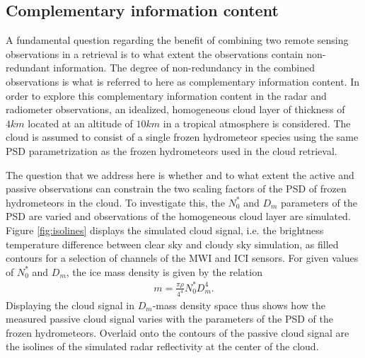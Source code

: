 \documentclass[journal abbreviation, manuscript]{copernicus}
\begin{document}
\subsection{Complementary information content}
\label{sec:orgdc1b0b8}

A fundamental question regarding the benefit of combining two remote sensing
observations in a retrieval is to what extent the observations contain
non-redundant information. The degree of non-redundancy in the combined
observations is what is referred to here as complementary information content.
In order to explore this complementary information content in the radar and
radiometer observations, an idealized, homogeneous cloud layer of thickness of
$4\unit{km}$ located at an altitude of $10\unit{km}$ in a tropical atmosphere is
considered. The cloud is assumed to consist of a single frozen hydrometeor
species using the same PSD parametrization as the frozen hydrometeors used in
the cloud retrieval.

The question that we address here is whether and to what extent the active and
passive observations can constrain the two scaling factors of the PSD of frozen
hydrometeors in the cloud. To investigate this, the $N_0^*$ and $D_m$ parameters
of the PSD are varied and observations of the homogeneous cloud layer are
simulated. Figure \ref{fig:isolines} displays the simulated cloud signal, i.e.
the brightness temperature difference between clear sky and cloudy sky
simulation, as filled contours for a selection of channels of the MWI and ICI
sensors. For given values of $N_0^*$ and $D_m$, the ice mass density is given by
the relation
\begin{align}
m = \frac{\pi \rho}{4 ^ 4}N_0^* D_m^4.
\end{align}
Displaying the cloud signal in $D_m$-mass density space thus shows how the
measured passive cloud signal varies with the parameters of the PSD of the
frozen hydrometeors. Overlaid onto the contours of the passive cloud signal are
the isolines of the simulated radar reflectivity at the center of the cloud.
\end{document}
